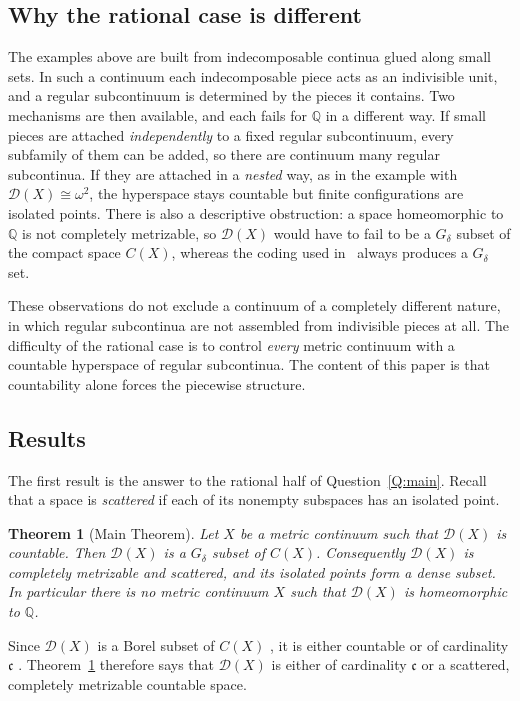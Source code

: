 \documentclass[11pt,reqno]{amsart}
\theoremstyle{plain}
\newtheorem{theorem}{Theorem}[section]
\theoremstyle{definition}
\theoremstyle{remark}
\newcommand{\D}{\mathcal{D}}
\newcommand{\Q}{\mathbb{Q}}
\newcommand{\cc}{\mathfrak{c}}
\begin{document}
\subsection{Why the rational case is different}
The examples above are built from indecomposable continua glued along small sets. In such a continuum each indecomposable piece acts as an indivisible unit, and a regular subcontinuum is determined by the pieces it contains. Two mechanisms are then available, and each fails for $\Q$ in a different way. If small pieces are attached \emph{independently} to a fixed regular subcontinuum, every subfamily of them can be added, so there are continuum many regular subcontinua. If they are attached in a \emph{nested} way, as in the example with $\D(X)\cong\omega^2$, the hyperspace stays countable but finite configurations are isolated points. There is also a descriptive obstruction: a space homeomorphic to $\Q$ is not completely metrizable, so $\D(X)$ would have to fail to be a $G_\delta$ subset of the compact space $C(X)$, whereas the coding used in~\cite{AdAirr} always produces a $G_\delta$ set.

These observations do not exclude a continuum of a completely different nature, in which regular subcontinua are not assembled from indivisible pieces at all. The difficulty of the rational case is to control \emph{every} metric continuum with a countable hyperspace of regular subcontinua. The content of this paper is that countability alone forces the piecewise structure.

\subsection{Results}
The first result is the answer to the rational half of Question~\ref{Q:main}. Recall that a space is \emph{scattered} if each of its nonempty subspaces has an isolated point.

\begin{theorem}[Main Theorem]\label{T:main}
Let $X$ be a metric continuum such that $\D(X)$ is countable. Then $\D(X)$ is a $G_\delta$ subset of $C(X)$. Consequently $\D(X)$ is completely metrizable and scattered, and its isolated points form a dense subset. In particular there is no metric continuum $X$ such that $\D(X)$ is homeomorphic to $\Q$.
\end{theorem}

Since $\D(X)$ is a Borel subset of $C(X)$ \cite[Teorema~2.0.2]{Ram23}, it is either countable or of cardinality $\cc$ \cite[Theorem~13.6]{Kechris}. Theorem~\ref{T:main} therefore says that $\D(X)$ is either of cardinality $\cc$ or a scattered, completely metrizable countable space.
\end{document}
